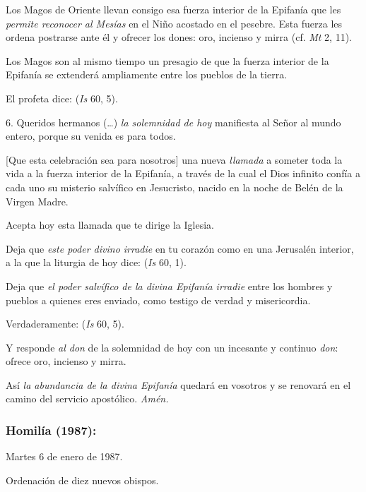 \begin{body}
	Los Magos de Oriente llevan consigo esa fuerza interior de la Epifanía que les \emph{permite reconocer al Mesías} en el Niño acostado en el pesebre. Esta fuerza les ordena postrarse ante él y ofrecer los dones: oro, incienso y mirra (cf. \emph{Mt} 2, 11).

	Los Magos son al mismo tiempo un presagio de que la fuerza interior de la Epifanía se extenderá ampliamente entre los pueblos de la tierra.

	El profeta dice:  (\emph{Is} 60, 5).

	6. Queridos hermanos (\ldots{}) \emph{la solemnidad de hoy} manifiesta al Señor al mundo entero, porque su venida es para todos.

	{[}Que esta celebración sea para nosotros{]} una nueva \emph{llamada} a someter toda la vida a la fuerza interior de la Epifanía, a través de la cual el Dios infinito confía a cada uno su misterio salvífico en Jesucristo, nacido en la noche de Belén de la Virgen Madre.

	Acepta hoy esta llamada que te dirige la Iglesia.

	Deja que \emph{este poder divino irradie} en tu corazón como en una Jerusalén interior, a la que la liturgia de hoy dice:  (\emph{Is} 60, 1).

	Deja que \emph{el poder salvífico de la divina Epifanía irradie} entre los hombres y pueblos a quienes eres enviado, como testigo de verdad y misericordia.

	Verdaderamente:  (\emph{Is} 60, 5).

	Y responde \emph{al don} de la solemnidad de hoy con un incesante y continuo \emph{don}: ofrece oro, incienso y mirra.

	Así \emph{la abundancia de la divina Epifanía} quedará en vosotros y se renovará en el camino del servicio apostólico. \emph{Amén.}

	\subsubsection{Homilía (1987):}

	Martes 6 de enero de 1987.

	Ordenación de diez nuevos obispos.


\end{body}
